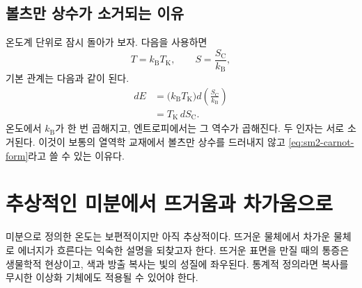 \subsection{볼츠만 상수가 소거되는 이유}

온도계 단위로 잠시 돌아가 보자. 다음을 사용하면
\[
 T=k_{\mathrm B}T_{\mathrm K},
 \qquad
 S=\frac{S_{\mathrm C}}{k_{\mathrm B}},
\]
기본 관계는 다음과 같이 된다.
\begin{align}
 dE
 &=\bigl(k_{\mathrm B}T_{\mathrm K}\bigr)
   d\left(\frac{S_{\mathrm C}}{k_{\mathrm B}}\right)\\
 &=T_{\mathrm K}\,dS_{\mathrm C}.
 \label{eq:sm2-carnot-form}
\end{align}
온도에서 \(k_{\mathrm B}\)가 한 번 곱해지고, 엔트로피에서는 그 역수가 곱해진다. 두 인자는 서로 소거된다. 이것이 보통의 열역학 교재에서 볼츠만 상수를 드러내지 않고 \eqref{eq:sm2-carnot-form}라고 쓸 수 있는 이유다.

\begin{classroomqa}
\end{classroomqa}

\section{추상적인 미분에서 뜨거움과 차가움으로}

미분으로 정의한 온도는 보편적이지만 아직 추상적이다. 뜨거운 물체에서 차가운 물체로 에너지가 흐른다는 익숙한 설명을 되찾고자 한다. 뜨거운 표면을 만질 때의 통증은 생물학적 현상이고, 색과 방출 복사는 빛의 성질에 좌우된다. 통계적 정의라면 복사를 무시한 이상화 기체에도 적용될 수 있어야 한다.

\begin{classroomqa}
\end{classroomqa}

